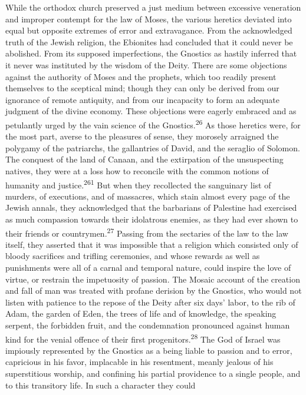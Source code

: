 While the orthodox church preserved a just medium between
excessive veneration and improper contempt for the law of Moses,
the various heretics deviated into equal but opposite extremes of
error and extravagance. From the acknowledged truth of the Jewish
religion, the Ebionites had concluded that it could never be
abolished. From its supposed imperfections, the Gnostics as
hastily inferred that it never was instituted by the wisdom of
the Deity. There are some objections against the authority of
Moses and the prophets, which too readily present themselves to
the sceptical mind; though they can only be derived from our
ignorance of remote antiquity, and from our incapacity to form an
adequate judgment of the divine economy. These objections were
eagerly embraced and as petulantly urged by the vain science of
the Gnostics.\textsuperscript{26} As those heretics were, for the most part,
averse to the pleasures of sense, they morosely arraigned the
polygamy of the patriarchs, the gallantries of David, and the
seraglio of Solomon. The conquest of the land of Canaan, and the
extirpation of the unsuspecting natives, they were at a loss how
to reconcile with the common notions of humanity and justice.\textsuperscript{261}
But when they recollected the sanguinary list of murders, of
executions, and of massacres, which stain almost every page of
the Jewish annals, they acknowledged that the barbarians of
Palestine had exercised as much compassion towards their
idolatrous enemies, as they had ever shown to their friends or
countrymen.\textsuperscript{27} Passing from the sectaries of the law to the law
itself, they asserted that it was impossible that a religion
which consisted only of bloody sacrifices and trifling
ceremonies, and whose rewards as well as punishments were all of
a carnal and temporal nature, could inspire the love of virtue,
or restrain the impetuosity of passion. The Mosaic account of the
creation and fall of man was treated with profane derision by the
Gnostics, who would not listen with patience to the repose of the
Deity after six days’ labor, to the rib of Adam, the garden of
Eden, the trees of life and of knowledge, the speaking serpent,
the forbidden fruit, and the condemnation pronounced against
human kind for the venial offence of their first progenitors.\textsuperscript{28}
The God of Israel was impiously represented by the Gnostics as a
being liable to passion and to error, capricious in his favor,
implacable in his resentment, meanly jealous of his superstitious
worship, and confining his partial providence to a single people,
and to this transitory life. In such a character they could
